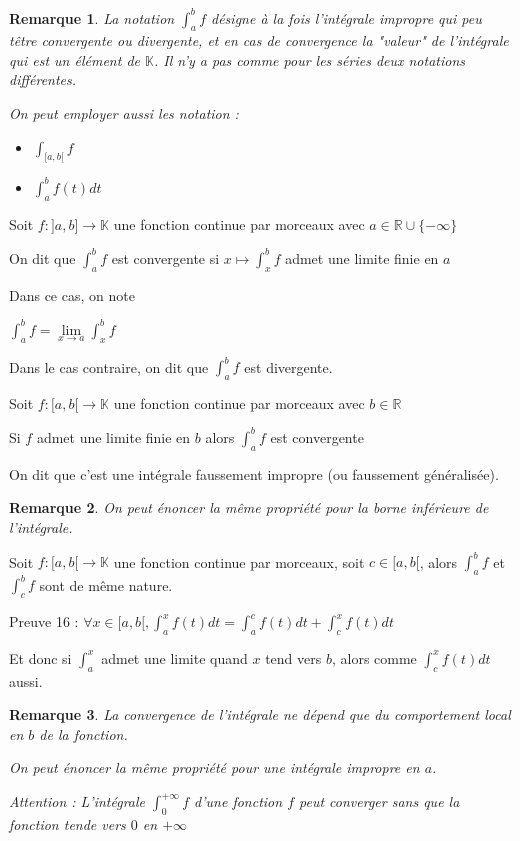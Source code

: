 \documentclass[a4paper,12pt]{book}
\newcommand{\Def}[2]{\begin{tcolorbox}[sharp corners, colback=white,colframe=blue!90!black!75, title=Définition : #1]#2\end{tcolorbox}}
\newcommand{\Prop}[2]{\begin{tcolorbox}[sharp corners, colback=white,colframe=red!90!black!75, title=Proposition : #1]#2\end{tcolorbox}}
\newcommand{\Pre}[1]{\begin{tcolorbox}[sharp corners, colback=white,colframe=green!60!green!30!black!75, title=Preuve]#1\end{tcolorbox}}
\newtheorem{Rem}{Remarque}[section]
\def\R{\mathbb{R}}
\def\K{\mathbb{K}}
\begin{document}
\begin{Rem}
La notation $\int_a^bf$ désigne à la fois l'intégrale impropre qui peu têtre convergente ou divergente, et en cas de convergence la "valeur" de l'intégrale qui est un élément de $\K$. Il n'y a pas comme pour les séries deux notations différentes. \par On peut employer aussi les notation : \begin{itemize}
\item $\int_{[a,b[}f$
\item $\int_a^bf(t)dt$
\end{itemize} 
\end{Rem}
\Def{}{Soit $f:]a,b]\to \K$ une fonction continue par morceaux avec $a\in\R\cup\{-\infty\}$ \par On dit que $\int_a^bf$ est convergente si $x\mapsto \int_x^bf$ admet une limite finie en $a$ \par Dans ce cas, on note \par\begin{center}$\int_a^bf=\lim\limits_{x\to a}\int_x^bf$\end{center} \par Dans le cas contraire, on dit que $\int_a^bf$ est divergente.}
\Prop{}{Soit $f:[a,b[\to\K$ une fonction continue par morceaux avec $b\in\R$\par Si $f$ admet une limite finie en $b$ alors $\int_a^bf$ est convergente \par On dit que c'est une intégrale faussement impropre (ou faussement généralisée).}
\begin{Rem}
On peut énoncer la même propriété pour la borne inférieure de l'intégrale.
\end{Rem}
\Prop{}{Soit $f:[a,b[\to\K$ une fonction continue par morceaux, soit $c\in[a,b[$, alors $\int_a^bf$ et $\int_c^bf$ sont de même nature.}
\Pre{Preuve 16 : $\forall x\in[a,b[, \int_a^xf(t)dt = \int_a^cf(t)dt + \int_c^xf(t)dt$ \par Et donc si $\int_a^x$ admet une limite quand $x$ tend vers $b$, alors comme $\int_c^xf(t)dt$ aussi.}
\begin{Rem}
La convergence de l'intégrale ne dépend que du comportement local en $b$ de la fonction. \par On peut énoncer la même propriété pour une intégrale impropre en $a$.
\par Attention : L'intégrale $\int_0^{+\infty}f$ d'une fonction $f$ peut converger sans que la fonction tende vers $0$ en $+\infty$
\end{Rem}
\end{document}
